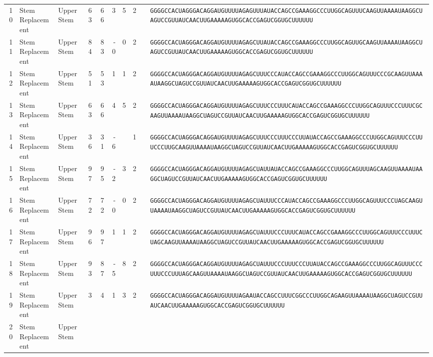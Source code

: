 \begin{tabular}{rllrrrrrcl}
 10 &
 Stem Replacement &
 Upper Stem &
 63 &
 66 &
 3 &
 5 &
 2 &
  &
 \verb|GGGGCCACUAGGGACAGGAUGUUUUAGAGUUUAUACCAGCCGAAAGGCCCUUGGCAGUUUCAAGUUAAAAUAAGGCUAGUCCGUUAUCAACUUGAAAAAGUGGCACCGAGUCGGUGCUUUUUU| \\
 11 &
 Stem Replacement &
 Upper Stem &
 84 &
 83 &
 -0 &
 0 &
 2 &
  &
 \verb|GGGGCCACUAGGGACAGGAUGUUUUAGAGCUUAUACCAGCCGAAAGGCCCUUGGCAGUUGCAAGUUAAAAUAAGGCUAGUCCGUUAUCAACUUGAAAAAGUGGCACCGAGUCGGUGCUUUUUU| \\
 12 &
 Stem Replacement &
 Upper Stem &
 51 &
 53 &
 1 &
 1 &
 2 &
  &
 \verb|GGGGCCACUAGGGACAGGAUGUUUUAGAGCUUUCCCAUACCAGCCGAAAGGCCCUUGGCAGUUUCCCGCAAGUUAAAAUAAGGCUAGUCCGUUAUCAACUUGAAAAAGUGGCACCGAGUCGGUGCUUUUUU| \\
 13 &
 Stem Replacement &
 Upper Stem &
 63 &
 66 &
 4 &
 5 &
 2 &
  &
 \verb|GGGGCCACUAGGGACAGGAUGUUUUAGAGCUUUCCCUUUCAUACCAGCCGAAAGGCCCUUGGCAGUUUCCCUUUCGCAAGUUAAAAUAAGGCUAGUCCGUUAUCAACUUGAAAAAGUGGCACCGAGUCGGUGCUUUUUU| \\
 14 &
 Stem Replacement &
 Upper Stem &
 36 &
 31 &
 -6 &
  &
 1 &
  &
 \verb|GGGGCCACUAGGGACAGGAUGUUUUAGAGCUUUCCCUUUCCCUUAUACCAGCCGAAAGGCCCUUGGCAGUUUCCCUUUCCCUUGCAAGUUAAAAUAAGGCUAGUCCGUUAUCAACUUGAAAAAGUGGCACCGAGUCGGUGCUUUUUU| \\
 15 &
 Stem Replacement &
 Upper Stem &
 97 &
 95 &
 -2 &
 3 &
 2 &
  &
 \verb|GGGGCCACUAGGGACAGGAUGUUUUAGAGCUAUUAUACCAGCCGAAAGGCCCUUGGCAGUUUAGCAAGUUAAAAUAAGGCUAGUCCGUUAUCAACUUGAAAAAGUGGCACCGAGUCGGUGCUUUUUU| \\
 16 &
 Stem Replacement &
 Upper Stem &
 72 &
 72 &
 -0 &
 0 &
 2 &
  &
 \verb|GGGGCCACUAGGGACAGGAUGUUUUAGAGCUAUUUCCCAUACCAGCCGAAAGGCCCUUGGCAGUUUCCCUAGCAAGUUAAAAUAAGGCUAGUCCGUUAUCAACUUGAAAAAGUGGCACCGAGUCGGUGCUUUUUU| \\
 17 &
 Stem Replacement &
 Upper Stem &
 96 &
 97 &
 1 &
 1 &
 2 &
  &
 \verb|GGGGCCACUAGGGACAGGAUGUUUUAGAGCUAUUUCCCUUUCAUACCAGCCGAAAGGCCCUUGGCAGUUUCCCUUUCUAGCAAGUUAAAAUAAGGCUAGUCCGUUAUCAACUUGAAAAAGUGGCACCGAGUCGGUGCUUUUUU| \\
 18 &
 Stem Replacement &
 Upper Stem &
 93 &
 87 &
 -5 &
 8 &
 2 &
  &
 \verb|GGGGCCACUAGGGACAGGAUGUUUUAGAGCUAUUUCCCUUUCCCUUAUACCAGCCGAAAGGCCCUUGGCAGUUUCCCUUUCCCUUUAGCAAGUUAAAAUAAGGCUAGUCCGUUAUCAACUUGAAAAAGUGGCACCGAGUCGGUGCUUUUUU| \\
 19 &
 Stem Replacement &
 Upper Stem &
 3 &
 4 &
 1 &
 3 &
 2 &
  &
 \verb|GGGGCCACUAGGGACAGGAUGUUUUAGAAUACCAGCCUUUCGGCCCUUGGCAGAAGUUAAAAUAAGGCUAGUCCGUUAUCAACUUGAAAAAGUGGCACCGAGUCGGUGCUUUUUU| \\
 20 &
 Stem Replacement &
 Upper Stem &

\end{tabular}

